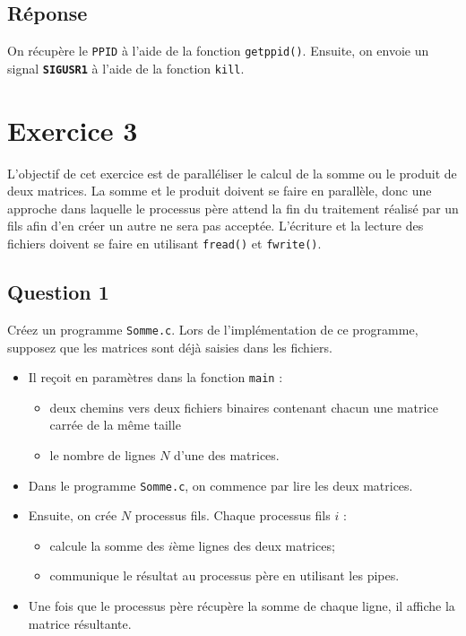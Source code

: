 \documentclass[
	12pt, %
]{fphw}
\begin{document}
\subsection*{Réponse}
On récupère le \texttt{PPID} à l'aide de la fonction \texttt{getppid()}. Ensuite, on envoie un signal \texttt{\textbf{SIGUSR1}} à l'aide de la fonction \texttt{kill}.



\section*{Exercice 3}
L'objectif de cet exercice est de paralléliser le calcul de la somme ou le produit de deux matrices.
La somme et le produit doivent se faire en parallèle, donc une approche dans laquelle le processus père attend la fin du traitement réalisé par un fils afin d'en créer un autre ne sera pas acceptée.
L'écriture et la lecture des fichiers doivent se faire en utilisant \texttt{fread()} et \texttt{fwrite()}.
\subsection*{Question 1}
\begin{problem}
Créez un programme \texttt{Somme.c}. Lors de l'implémentation de ce programme, supposez que les matrices sont déjà saisies dans les fichiers.
\begin{itemize}
	\item Il reçoit en paramètres dans la fonction \texttt{main} :
	\begin{itemize}
		\item deux chemins vers deux fichiers binaires contenant chacun une matrice carrée de la même taille 
		\item le nombre de lignes $N$ d'une des matrices. 
	\end{itemize}
	\item Dans le programme \texttt{Somme.c}, on commence par lire les deux matrices. 
	\item Ensuite, on crée $N$ processus fils. Chaque processus fils $i$ :
	\begin{itemize}
		\item calcule la somme des $i$ème lignes des deux matrices;
		\item communique le résultat au processus père en utilisant les pipes. 
	\end{itemize} 
	\item Une fois que le processus père récupère la somme de chaque ligne, il affiche la matrice résultante.
\end{itemize}
\end{problem}
\end{document}
